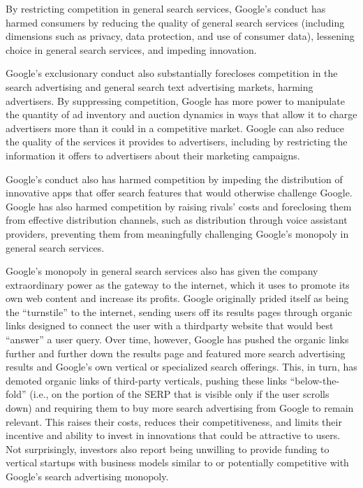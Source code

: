 \documentclass[11pt,b5paper]{scrartcl}
\begin{document}

By restricting competition in general search services, Google’s conduct has
harmed consumers by reducing the quality of general search services (including dimensions such
as privacy, data protection, and use of consumer data), lessening choice in general search
services, and impeding innovation.


Google’s exclusionary conduct also substantially forecloses competition in the
search advertising and general search text advertising markets, harming advertisers. By
suppressing competition, Google has more power to manipulate the quantity of ad inventory and
auction dynamics in ways that allow it to charge advertisers more than it could in a competitive
market. Google can also reduce the quality of the services it provides to advertisers, including by
restricting the information it offers to advertisers about their marketing campaigns.


Google’s conduct also has harmed competition by impeding the distribution of
innovative apps that offer search features that would otherwise challenge Google. Google has
also harmed competition by raising rivals’ costs and foreclosing them from effective distribution
channels, such as distribution through voice assistant providers, preventing them from
meaningfully challenging Google’s monopoly in general search services.


Google’s monopoly in general search services also has given the company
extraordinary power as the gateway to the internet, which it uses to promote its own web content
and increase its profits. Google originally prided itself as being the “turnstile” to the internet,
sending users off its results pages through organic links designed to connect the user with a thirdparty website that would best “answer” a user query. Over time, however, Google has pushed the
organic links further and further down the results page and featured more search advertising
results and Google’s own vertical or specialized search offerings. This, in turn, has demoted
organic links of third-party verticals, pushing these links “below-the-fold” (i.e., on the portion of
the SERP that is visible only if the user scrolls down) and requiring them to buy more search
advertising from Google to remain relevant. This raises their costs, reduces their
competitiveness, and limits their incentive and ability to invest in innovations that could be
attractive to users. Not surprisingly, investors also report being unwilling to provide funding to
vertical startups with business models similar to or potentially competitive with Google’s search
advertising monopoly.
\end{document}
